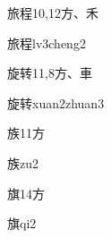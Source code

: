 \begin{entry}{旅程}{10,12}{⽅、⽲}
  \begin{phonetics}{旅程}{lv3cheng2}
  \end{phonetics}
\end{entry}

\begin{entry}{旋转}{11,8}{⽅、⾞}
  \begin{phonetics}{旋转}{xuan2zhuan3}
  \end{phonetics}
\end{entry}

\begin{entry}{族}{11}{⽅}
  \begin{phonetics}{族}{zu2}
  \end{phonetics}
\end{entry}

\begin{entry}{旗}{14}{⽅}
  \begin{phonetics}{旗}{qi2}
  \end{phonetics}
\end{entry}


